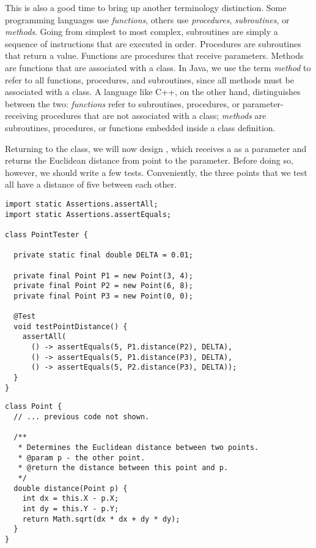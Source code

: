 This is also a good time to bring up another terminology distinction. 
Some programming languages use \emph{functions}, others use \emph{procedures}, \emph{subroutines}, or \emph{methods}. 
Going from simplest to most complex, subroutines are simply a sequence of instructions that are executed in order. 
Procedures are subroutines that return a value. 
Functions are procedures that receive parameters. 
Methods are functions that are associated with a class. 
In Java, we use the term \emph{method} to refer to all functions, procedures, and subroutines, since all methods must be associated with a class. 
A language like C++, on the other hand, distinguishes between the two: \emph{functions} refer to subroutines, procedures, or parameter-receiving procedures that are not associated with a class; \emph{methods} are subroutines, procedures, or functions embedded inside a class definition.

Returning to the  class, we will now design , which receives a  as a parameter and returns the Euclidean distance from  point to the parameter. 
Before doing so, however, we should write a few tests. 
Conveniently, the three points that we test all have a distance of five between each other.

\begin{lstlisting}[language=MyJava]
import static Assertions.assertAll;
import static Assertions.assertEquals;

class PointTester {

  private static final double DELTA = 0.01;

  private final Point P1 = new Point(3, 4);
  private final Point P2 = new Point(6, 8);
  private final Point P3 = new Point(0, 0);

  @Test
  void testPointDistance() {
    assertAll(
      () -> assertEquals(5, P1.distance(P2), DELTA),
      () -> assertEquals(5, P1.distance(P3), DELTA),
      () -> assertEquals(5, P2.distance(P3), DELTA));
  }
}
\end{lstlisting}

\begin{lstlisting}[language=MyJava]
class Point {
  // ... previous code not shown.

  /**
   * Determines the Euclidean distance between two points.
   * @param p - the other point.
   * @return the distance between this point and p.
   */
  double distance(Point p) {
    int dx = this.X - p.X;
    int dy = this.Y - p.Y;
    return Math.sqrt(dx * dx + dy * dy);
  }
}
\end{lstlisting}

